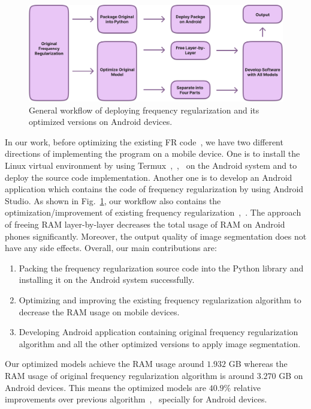 \documentclass[runningheads]{llncs}
\begin{document}
\begin{figure}[htbp]
	\centering
	\label{image:workflow}
	\includegraphics[width=1\linewidth]{figures/workflow.jpg}
	\caption{General workflow of deploying frequency regularization and its optimized versions on Android devices.}
\end{figure}

In our work, before optimizing the existing FR code~\cite{fr_repo}, we have two different directions of implementing the program on a mobile device. One is to install the Linux virtual environment by using Termux~\cite{termux_repo},~\cite{termux_overview},~\cite{termux_wiki} on the Android system and to deploy the source code implementation. Another one is to develop an Android application which contains the code of frequency regularization by using Android Studio. As shown in Fig.~\ref{image:workflow}, our workflow also contains the optimization/improvement of existing frequency regularization~\cite{zhao2023fr},~\cite{fr_repo}. The approach of freeing RAM layer-by-layer decreases the total usage of RAM on Android phones significantly. Moreover, the output quality of image segmentation does not have any side effects. Overall, our main contributions are:
\begin{enumerate}
	\item Packing the frequency regularization source code into the Python library and installing it on the Android system successfully.
	\item Optimizing and improving the existing frequency regularization algorithm to decrease the RAM usage on mobile devices.
	\item Developing Android application containing original frequency regularization algorithm and all the other optimized versions to apply image segmentation.
\end{enumerate}

Our optimized models achieve the RAM usage around $1.932$ GB whereas the RAM usage of original frequency regularization algorithm is around $3.270$ GB on Android devices. This means the optimized models are $40.9\%$ relative improvements over previous algorithm~\cite{zhao2023fr},~\cite{fr_repo} specially for Android devices. %
\end{document}
